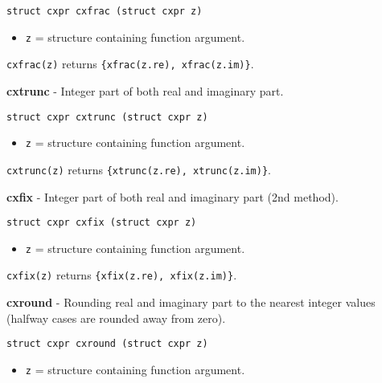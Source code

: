 \documentclass{article}
\begin{document}
\begin{verbatim}
struct cxpr cxfrac (struct cxpr z)
\end{verbatim}

\begin{itemize}
\item \texttt{z} = structure containing function argument.
\end{itemize}

\texttt{cxfrac(z)} returns \texttt{\{xfrac(z.re), xfrac(z.im)\}}.


\hrulefill{}

\textbf{cxtrunc} - Integer part of both real and imaginary part.

\begin{verbatim}
struct cxpr cxtrunc (struct cxpr z)
\end{verbatim}

\begin{itemize}
\item \texttt{z} = structure containing function argument.
\end{itemize}

\texttt{cxtrunc(z)} returns \texttt{\{xtrunc(z.re), xtrunc(z.im)\}}.


\hrulefill{}

\textbf{cxfix} - Integer part of both real and imaginary part (2nd method).

\begin{verbatim}
struct cxpr cxfix (struct cxpr z)
\end{verbatim}

\begin{itemize}
\item \texttt{z} = structure containing function argument.
\end{itemize}

\texttt{cxfix(z)} returns \texttt{\{xfix(z.re), xfix(z.im)\}}.


\hrulefill{}

\textbf{cxround} - Rounding real and imaginary part
to the nearest integer values 
(halfway cases are rounded away from zero).

\begin{verbatim}
struct cxpr cxround (struct cxpr z)
\end{verbatim}

\begin{itemize}
\item \texttt{z} = structure containing function argument.
\end{itemize}
\end{document}

